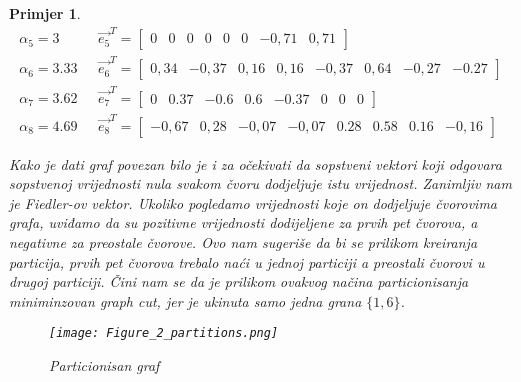 \documentclass[11pt]{article}
\newtheorem{example}{Primjer}
\begin{document}
\begin{example}
\[\begin{split}
				\alpha_5=3 \texttt{~~~~} & \vec{e_5}^T = \begin{bmatrix} 0  &  0  &  0  &  0  &  0  &  0  & -0,71  &  0,71                         \end{bmatrix} \\
				\alpha_6=3.33 \texttt{~~} & \vec{e_6}^T = \begin{bmatrix} 0,34  &  -0,37  &  0,16  &  0,16  &  -0,37  &  0,64  &  -0,27  &  -0.27   \end{bmatrix} \\
				\alpha_7=3.62 \texttt{~~} & \vec{e_7}^T = \begin{bmatrix} 0  &  0.37  &  -0.6  &  0.6  &  -0.37  &  0  &  0  &  0            \end{bmatrix} \\
				\alpha_8=4.69 \texttt{~~} & \vec{e_8}^T = \begin{bmatrix} -0,67  &  0,28  &  -0,07  &  -0,07  &  0.28  &  0.58  &  0.16  &  -0,16        \end{bmatrix}
			\end{split}
			\]
			
			Kako je dati graf povezan bilo je i za očekivati da sopstveni vektori koji odgovara sopstvenoj vrijednosti nula svakom čvoru dodjeljuje istu vrijednost.
			Zanimljiv nam je Fiedler-ov vektor. Ukoliko pogledamo vrijednosti koje on dodjeljuje čvorovima grafa, uviđamo da su pozitivne 
			vrijednosti dodijeljene za prvih pet čvorova, a negativne za preostale čvorove. Ovo nam sugeriše da bi se prilikom kreiranja particija, prvih pet čvorova trebalo naći u jednoj particiji a preostali čvorovi u drugoj particiji.
			Čini nam se da je prilikom ovakvog načina particionisanja miniminzovan graph cut, jer je ukinuta samo jedna grana $\{1,6\}$.
			
			\begin{figure}[h]
				\centering
				\texttt{[image: Figure\_2\_partitions.png]}
				\caption{Particionisan graf}
			\end{figure}
		\end{example}
		
\end{document}
